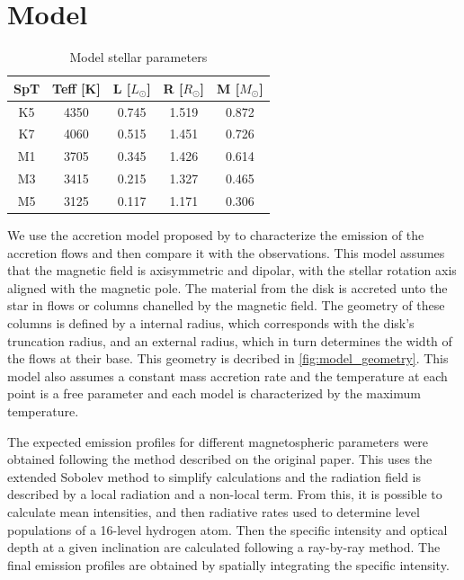 \documentclass[twocolumn,linenumbers]{aastex631}
\begin{document}
\section{Model} \label{Models}


\begin{table}
\centering
\caption{Model stellar parameters}
\begin{tabular}{ccccc}
\hline
SpT & Teff {[}K{]} & L {[}$L_{\odot}${]} & R {[}$R_{\odot}${]} & M {[}$M_{\odot}${]} \\ \hline
K5  & 4350         & 0.745               & 1.519               & 0.872               \\
K7  & 4060         & 0.515               & 1.451               & 0.726               \\
M1  & 3705         & 0.345               & 1.426               & 0.614               \\
M3  & 3415         & 0.215               & 1.327               & 0.465               \\
M5  & 3125         & 0.117               & 1.171               & 0.306               \\ \hline
\end{tabular}
\label{table:parametros_modelos}
\end{table}

We use the accretion model proposed by \citet{muzerolle2001} to characterize the emission of the accretion flows and then compare it with the observations. This model  assumes that the magnetic field is axisymmetric and dipolar, with the stellar rotation axis aligned with the magnetic pole. The material from the disk is accreted unto the star in flows or columns chanelled by the magnetic field. The geometry of these columns is defined by a internal radius, which corresponds with the disk's truncation radius, and an external radius, which  in turn determines the width of the flows at their base. This geometry is decribed in  \ref{fig:model_geometry}. This model also assumes a constant mass accretion rate and the temperature at each point is a free parameter and each model is characterized by the maximum temperature.

The expected emission profiles for different magnetospheric parameters were obtained following the method described on the original paper. This uses the extended Sobolev method to simplify calculations and the radiation field is described by a local radiation and a non-local term. From this, it is possible to calculate mean intensities, and then radiative rates used to determine level populations of a 16-level hydrogen atom. Then the specific intensity and optical depth at a given inclination are calculated following a ray-by-ray method. The final emission profiles are obtained by spatially integrating the specific intensity.
\end{document}
